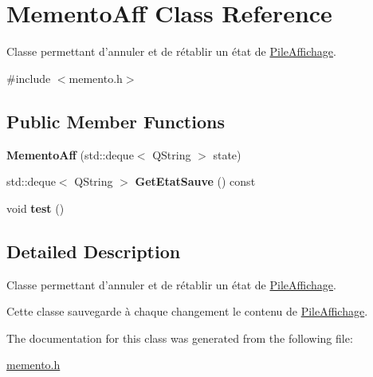 \hypertarget{class_memento_aff}{\section{Memento\-Aff Class Reference}
\label{class_memento_aff}
}


Classe permettant d'annuler et de rétablir un état de \hyperlink{class_pile_affichage}{Pile\-Affichage}.  




{\ttfamily \#include $<$memento.\-h$>$}

\subsection*{Public Member Functions}
\begin{DoxyCompactItemize}
\item 
\hypertarget{class_memento_aff_a0286b7961cf51f82ca2241b7aa8a9d3b}{{\bfseries Memento\-Aff} (std\-::deque$<$ Q\-String $>$ state)}\label{class_memento_aff_a0286b7961cf51f82ca2241b7aa8a9d3b}

\item 
\hypertarget{class_memento_aff_ab2e4c86ddea4e8da29e7b3410c860c97}{std\-::deque$<$ Q\-String $>$ {\bfseries Get\-Etat\-Sauve} () const }\label{class_memento_aff_ab2e4c86ddea4e8da29e7b3410c860c97}

\item 
\hypertarget{class_memento_aff_ab71f491485e0515fb09740c7ace4acfc}{void {\bfseries test} ()}\label{class_memento_aff_ab71f491485e0515fb09740c7ace4acfc}

\end{DoxyCompactItemize}


\subsection{Detailed Description}
Classe permettant d'annuler et de rétablir un état de \hyperlink{class_pile_affichage}{Pile\-Affichage}. 

Cette classe sauvegarde à chaque changement le contenu de \hyperlink{class_pile_affichage}{Pile\-Affichage}. 

The documentation for this class was generated from the following file\-:\begin{DoxyCompactItemize}
\item 
\hyperlink{memento_8h}{memento.\-h}\end{DoxyCompactItemize}
